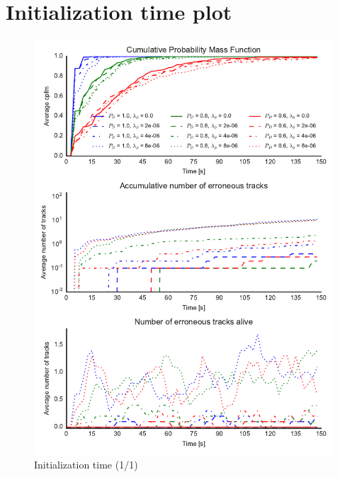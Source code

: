 
\chapter{Initialization time plot}
\begin{figure}
\centering
\includegraphics{Figures/plots/Scenario1_Init-Time(1-1).pdf}
\caption{Initialization time (1/1)}\label{fig:init_time_1-1}
\end{figure}

